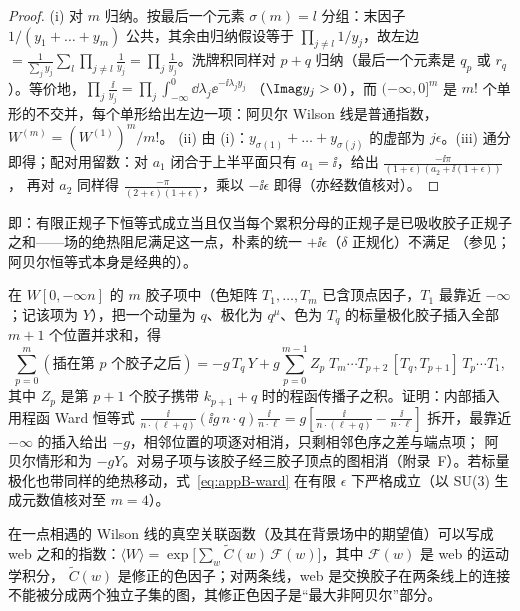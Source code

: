 \begin{proof}
(i) 对 $m$ 归纳。按最后一个元素 $\sigma(m)=l$ 分组：末因子 $1/(y_1+\dots+y_m)$ 公共，其余由归纳假设等于 $\prod_{j\ne l}1/y_j$，故左边
$=\frac{1}{\sum_jy_j}\sum_l\prod_{j\ne l}\frac1{y_j}=\prod_j\frac1{y_j}$。洗牌积同样对 $p+q$ 归纳（最后一个元素是 $q_p$ 或 $r_q$）。等价地，$\prod_j\frac{\ii}{y_j}=\prod_j\int_{-\infty}^0\dd\lambda_j\ee^{-\ii\lambda_jy_j}$
（$\Imag y_j>0$），而 $(-\infty,0]^m$ 是 $m!$ 个单形的不交并，每个单形给出左边一项：阿贝尔 Wilson 线是普通指数，$W^{(m)}=(W^{(1)})^m/m!$。
(ii) 由 (i)：$y_{\sigma(1)}+\dots+y_{\sigma(j)}$ 的虚部为 $j\epsilon$。(iii) 通分即得；配对用留数：对 $a_1$ 闭合于上半平面只有 $a_1=\ii$，给出 $\frac{-\ii\pi}{(1+\epsilon)(a_2+\ii(1+\epsilon))}$，
再对 $a_2$ 同样得 $\frac{-\pi}{(2+\epsilon)(1+\epsilon)}$，乘以 $-\ii\epsilon$ 即得（亦经数值核对）。%
\end{proof}

即：有限正规子下恒等式成立当且仅当每个累积分母的正规子是已吸收胶子正规子之和——场的绝热阻尼满足这一点，朴素的统一 $+\ii\epsilon$（$\delta$ 正规化）不满足
（参见\cite[式~(5)--(6)]{Echevarria:2015byo}；阿贝尔恒等式本身是经典的）。

\begin{remark}\label{rem:appB-ward}
在 $W[0,-\infty n]$ 的 $m$ 胶子项中（色矩阵 $T_1,\dots,T_m$ 已含顶点因子，$T_1$ 最靠近 $-\infty$；记该项为 $Y$），把一个动量为 $q$、极化为 $q^\mu$、色为 $T_q$ 的标量极化胶子插入全部 $m+1$ 个位置并求和，得
\begin{equation}\label{eq:appB-ward}
\sum_{p=0}^{m}(\text{插在第 }p\text{ 个胶子之后})=-g\,T_q\,Y+g\sum_{p=0}^{m-1}Z_p\;T_m\cdots T_{p+2}\,[T_q,T_{p+1}]\,T_p\cdots T_1 ,
\end{equation}
其中 $Z_p$ 是第 $p+1$ 个胶子携带 $k_{p+1}+q$ 时的程函传播子之积。证明：内部插入用程函 Ward 恒等式
$\frac{\ii}{n\cdot(\ell+q)}(\ii g\,n\cdot q)\frac{\ii}{n\cdot\ell}=g[\frac{\ii}{n\cdot(\ell+q)}-\frac{\ii}{n\cdot\ell}]$ 拆开，最靠近 $-\infty$ 的插入给出 $-g$，相邻位置的项逐对相消，只剩相邻色序之差与端点项；
阿贝尔情形和为 $-gY$。对易子项与该胶子经三胶子顶点的图相消（附录~F）。若标量极化也带同样的绝热移动，式~\eqref{eq:appB-ward} 在有限 $\epsilon$ 下严格成立（以 SU(3) 生成元数值核对至 $m=4$）。%
\end{remark}

\begin{proposition}\label{prop:appB-webs}
在一点相遇的 Wilson 线的真空关联函数（及其在背景场中的期望值）可以写成 web 之和的指数：$\langle W\rangle=\exp\big[\sum_w\tilde C(w)\,\mathcal F(w)\big]$，其中 $\mathcal F(w)$ 是 web 的运动学积分，
$\tilde C(w)$ 是修正的色因子；对两条线，web 是交换胶子在两条线上的连接不能被分成两个独立子集的图，其修正色因子是“最大非阿贝尔”部分\cite{Gatheral1983,FrenkelTaylor1984}。
\end{proposition}


